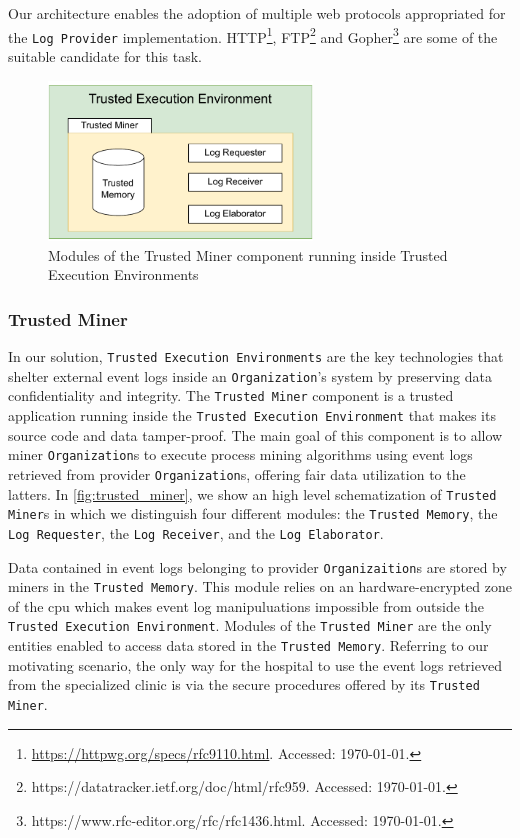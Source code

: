 Our architecture enables the adoption of multiple web protocols appropriated for the \texttt{Log Provider} implementation. HTTP\footnote{\url{https://httpwg.org/specs/rfc9110.html}. Accessed: \today.}, FTP\footnote{https://datatracker.ietf.org/doc/html/rfc959. Accessed: \today.} and Gopher\footnote{https://www.rfc-editor.org/rfc/rfc1436.html. Accessed: \today.} are some of the suitable candidate for this task.
\label{fig:trusted_miner}
\begin{figure}[t]
\centering
\includegraphics[width=7cm]{content/figures/Trusted_miner.pdf}
\caption{Modules of the Trusted Miner component running inside Trusted Execution Environments}
\label{fig:implementation}
\end{figure}
\subsubsection{Trusted Miner}
In our solution, \texttt{Trusted Execution Environments} are the key technologies that shelter external event logs inside an \texttt{Organization}'s system by preserving data confidentiality and integrity. The \texttt{Trusted Miner} component is a trusted application running inside the \texttt{Trusted Execution Environment} that makes its source code and data tamper-proof. The main goal of this component is to allow miner \texttt{Organization}s to execute process mining algorithms using %
event logs retrieved from provider \texttt{Organization}s, offering fair data utilization to the latters. In \cref{fig:trusted_miner}, we show an high level schematization of \texttt{Trusted Miner}s in which we distinguish four different modules: the \texttt{Trusted Memory}, the \texttt{Log Requester}, the \texttt{Log Receiver}, and the \texttt{Log Elaborator}.

Data contained in event logs belonging to provider \texttt{Organizaition}s are stored by miners in the \texttt{Trusted Memory}. This module relies on an hardware-encrypted zone of the cpu which makes event log manipuluations impossible from outside the \texttt{Trusted Execution Environment}. Modules of the \texttt{Trusted Miner} are the only entities enabled to access data stored in the \texttt{Trusted Memory}. Referring to our motivating scenario, the only way for the hospital to use the event logs retrieved from the specialized clinic is via the secure procedures offered by its \texttt{Trusted Miner}.

